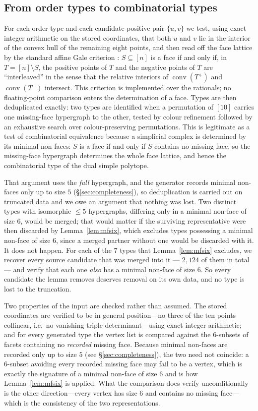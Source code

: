 \documentclass[11pt,reqno]{amsart}
\theoremstyle{plain}
\theoremstyle{definition}
\DeclareMathOperator{\conv}{conv}
\newcommand{\NumBigMF}{7}
\begin{document}
\subsection{From order types to combinatorial types}
For each order type and each candidate positive pair $\{u,v\}$ we test, using
exact integer arithmetic on the stored coordinates, that both $u$ and $v$ lie in
the interior of the convex hull of the remaining eight points, and then read off
the face lattice by the standard affine Gale criterion \cite[\S6.4]{Ziegler1995}:
$S\subseteq[n]$ is a face if and only if, in $T=[n]\setminus S$, the positive
points of $T$ and the negative points of $T$ are ``interleaved'' in the sense
that the relative interiors of $\conv(T^+)$ and $\conv(T^-)$ intersect. This
criterion is implemented over the rationals; no floating-point comparison enters the
determination of a face. Types are then deduplicated exactly: two types are
identified when a permutation of $[10]$ carries one missing-face hypergraph to
the other, tested by colour refinement followed by an exhaustive search over
colour-preserving permutations. This is legitimate as a test of combinatorial
equivalence because a simplicial complex is determined by its minimal non-faces:
$S$ is a face if and only if $S$ contains no missing face, so the missing-face
hypergraph determines the whole face lattice, and hence the combinatorial type of
the dual simple polytope.

That argument uses the \emph{full} hypergraph, and the generator records minimal
non-faces only up to size $5$ (\S\ref{sec:completeness}), so deduplication is
carried out on truncated data and we owe an argument that nothing was lost. Two
distinct types with isomorphic $\le5$ hypergraphs, differing only in a minimal
non-face of size $6$, would be merged; that would matter if the surviving
representative were then discarded by Lemma~\ref{lem:mfsix}, which excludes types
possessing a minimal non-face of size $6$, since a merged partner without one
would be discarded with it. It does not happen. For each of the $\NumBigMF$ types
that Lemma~\ref{lem:mfsix} excludes, we recover every source candidate that was
merged into it --- $2{,}124$ of them in total --- and verify that each one
\emph{also} has a minimal non-face of size $6$. So every candidate the lemma
removes deserves removal on its own data, and no type is lost to the truncation.

Two properties of the input are checked rather than assumed. The stored
coordinates are verified to be in general position---no three of the ten points
collinear, i.e.\ no vanishing triple determinant---using exact integer arithmetic;
and for every generated type the vertex list is compared against the $6$-subsets of
facets containing no \emph{recorded} missing face. Because minimal non-faces are
recorded only up to size $5$ (see \S\ref{sec:completeness}), the two need not
coincide: a $6$-subset avoiding every recorded missing face may fail to be a vertex,
which is exactly the signature of a minimal non-face of size $6$ and is how
Lemma~\ref{lem:mfsix} is applied. What the comparison does verify unconditionally is
the other direction---every vertex has size $6$ and contains no missing face---which
is the consistency of the two representations.
\end{document}
